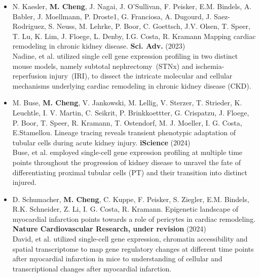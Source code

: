 \begin{addmargin}{0.02\textwidth}
	\begin{itemize}
	\item N. Kaesler, \textbf{M. Cheng}, J. Nagai, J. O’Sullivan, F. Peisker, E.M. Bindels, A. Babler, J. Moellmann, P. Droste1, G. Franciosa, A. Dugourd, J. Saez-Rodriguez, S. Neuss, M. Lehrke, P. Boor, C. Goettsch, J.V. Olsen, T. Speer, T. Lu, K. Lim,
J. Floege, L. Denby, I.G. Costa, R. Kramann Mapping cardiac remodeling in chronic kidney disease. \textbf{Sci. Adv.} (2023)\\

	Nadine, et al. utilized single cell gene expression profiling in two distinct mouse models, namely subtotal nephrectomy~(STNx) and ischemia-reperfusion injury~(IRI), to dissect the intricate molecular and cellular mechanisms underlying cardiac remodeling in chronic kidney disease (CKD). \\
	\end{itemize}
\end{addmargin}

\begin{addmargin}{0.02\textwidth}
	\begin{itemize}
	\item M. Buse, \textbf{M. Cheng}, V. Jankowski, M. Lellig, V. Sterzer, T. Strieder, K. Leuchtle, I. V. Martin, C. Seikrit, P. Brinkkoettter, G. Crispatzu, J. Floege, P. Boor, T. Speer, R. Kramann, T. Ostendorf, M. J. Moeller, I. G. Costa, E.Stamellou. Lineage tracing reveals transient phenotypic adaptation of tubular cells during acute kidney injury. \textbf{iScience} (2024)  \\

	Buse, et al. employed single-cell gene expression profiling at multiple time points throughout the progression of kidney disease to unravel the fate of differentiating proximal tubular cells (PT) and their transition into distinct injured. \\
	\end{itemize}
\end{addmargin}

\begin{addmargin}{0.02\textwidth}
	\begin{itemize}
	\item D. Schumacher, \textbf{M. Cheng}, C. Kuppe, F. Peisker, S. Ziegler, E.M. Bindels, R.K. Schneider,  Z. Li,  I. G. Costa, R. Kramann. Epigenetic landscape of myocardial infarction points towards a role of pericytes in cardiac remodeling. \textbf{Nature Cardiovascular Research, under revision} (2024) \\

	David, et al. utilized single-cell gene expression, chromatin accessibility and spatial transcriptome to map gene regulatory changes  at different time points after myocardial infarction in mice to understanding of cellular and transcriptional changes after myocardial infarction.\\
	\end{itemize}
\end{addmargin}



